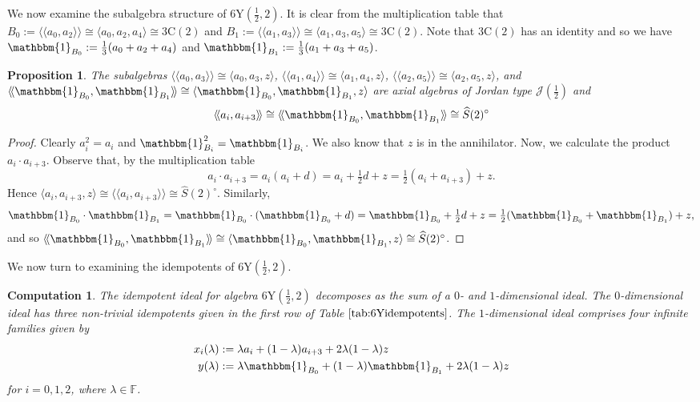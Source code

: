 \documentclass[11pt, a4paper]{article}
\theoremstyle{plain}
\newtheorem{proposition}[theorem]{Proposition}
\newtheorem{computation}[theorem]{Computation}
\theoremstyle{definition}
\newcommand\lm{\lambda}
\newcommand\cJ{\mathcal{J}}
\newcommand\la{\langle}
\newcommand\ra{\rangle}
\newcommand\lla{\langle\!\langle}
\newcommand\rra{\rangle\!\rangle}
\newcommand\FF{\mathbb{F}}
\newcommand{\C}{\mathrm{C}}
\newcommand{\Y}{\mathrm{Y}}
\newcommand{\0}{\overline{0}}
\newcommand{\2}{\overline{2}}
\newcommand{\1}{\mathbbm{1}}
\begin{document}
	We now examine the subalgebra structure of $6\Y(\frac{1}{2}, 2)$.  It is clear from the multiplication table that $ B_0 := \lla a_0, a_{2} \rra \cong \la a_0,a_{2}, a_4 \ra \cong 3\C(2)$ and $ B_1 := \lla a_1, a_{3} \rra \cong \la a_1,a_{3}, a_5 \ra \cong 3\C(2)$.  Note that $3\C(2)$ has an identity and so we have $\1_{B_0} := \tfrac{1}{3}(a_0+a_2+a_4)$ and $\1_{B_1} := \tfrac{1}{3}(a_1+a_3+a_5)$.
	
	
\begin{proposition}\label{6Ysub2}
	The subalgebras $ \lla a_0, a_{3} \rra \cong \la a_0,a_3, z \ra$, $ \lla a_1, a_{4} \rra \cong \la a_1,a_4,z \ra$, $ \lla a_2, a_{5} \rra \cong \la a_2,a_5,z \ra$, and  $ \lla \1_{B_0}, \1_{B_1} \rra \cong \la \1_{B_0},\1_{B_1},z \ra$ are axial algebras of Jordan type $\cJ(\tfrac{1}{2})$ and
	\[
	\lla a_i, a_{i+3}\rra \cong \lla \1_{B_0}, \1_{B_1}\rra \cong \widehat{S}(2)^\circ
	\]
\end{proposition}
\begin{proof}
Clearly $a_i^2=a_i$ and $\1_{B_{i}}^2=\1_{B_{i}}$. We also know that $z$ is in the annihilator. Now, we calculate the product $a_i\cdot a_{i+3}$.  Observe that, by the multiplication table 
\[
a_i\cdot a_{i+3}=  a_i(a_i+d) = a_i  + \tfrac{1}{2}d +z = \tfrac{1}{2}(a_i+a_{i+3})+z.
\]
Hence $\la a_i,a_{i+3},z \ra \cong \lla a_i, a_{i+3} \rra \cong \widehat{S}(2)^\circ $. Similarly,
\[
\1_{B_0}\cdot\1_{B_1} = \1_{B_0}\cdot(\1_{B_0}+d) = \1_{B_0} + \tfrac{1}{2}d +z = \tfrac{1}{2}(\1_{B_0}+\1_{B_1})+z,
\]
and so $\lla \1_{B_0}, \1_{B_1} \rra \cong \la \1_{B_0},\1_{B_1},z \ra \cong \widehat{S}(2)^\circ$.
\end{proof}
	
We now turn to examining the idempotents of $6\Y(\frac{1}{2}, 2)$. 

\begin{computation}
The idempotent ideal for algebra $6\Y(\frac{1}{2},2)$ decomposes as the sum of a $0$- and $1$-dimensional ideal.  The $0$-dimensional ideal has three non-trivial idempotents given in the first row of Table $\ref{tab:6Yidempotents}$.  The $1$-dimensional ideal comprises four infinite families given by
\begin{align*}
x_i(\lm) &:= \lm a_i + (1-\lm) a_{i+3} + 2\lm(1-\lm)z \\
y(\lm) &:= \lm \1_{B_0} + (1-\lm) \1_{B_1} + 2\lm(1-\lm)z
\end{align*}
for $i = 0,1,2$, where $\lm \in \FF$.
\end{computation}
\end{document}
